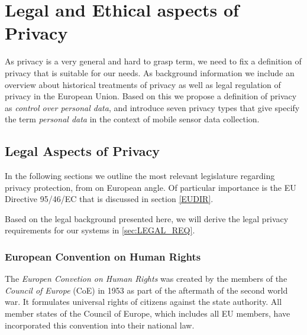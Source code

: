 
\chapter{Legal and Ethical aspects of Privacy}
\label{chap:privacy}

\newcommand{\om}{[...]\xspace} %

As privacy is a very general and hard to grasp term, we need to fix a definition of privacy that is suitable for our needs.
As background information we include an overview about historical treatments of privacy as well as legal regulation of privacy in the European Union.
Based on this we propose a definition of privacy as {\em control over personal data}, and introduce seven privacy types that give specify the term {\em personal data} in the context of mobile sensor data collection.


\section{Legal Aspects of Privacy}

In the following sections we outline the most relevant legislature regarding privacy protection,
from on European angle.
Of particular importance is the EU Directive 95/46/EC that is discussed in section \ref{EUDIR}.

Based on the legal background presented here, we will derive the legal privacy requirements for our systems in \ref{sec:LEGAL_REQ}.

\subsection{European Convention on Human Rights}

The \emph{Europen Convetion on Human Rights} \cite{ECHR} was created by the members of the \emph{Council of Europe} (CoE) in 1953 as part of the aftermath of the second world war.
It formulates universal rights of citizens against the state authority.
All member states of the Council of Europe, which includes all EU members, have incorporated this convention into their national law.

